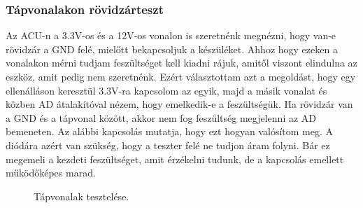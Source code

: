 \documentclass[a4paper, 12pt]{article}
\begin{document}
\subsubsection{Tápvonalakon rövidzárteszt}
Az ACU-n a 3.3V-os és a 12V-os vonalon is szeretnénk megnézni, hogy van-e rövidzár a GND felé, mielőtt bekapcsoljuk a készüléket. Ahhoz hogy ezeken a vonalakon mérni tudjam feszültséget kell kiadni rájuk, amitől viszont elindulna az eszköz, amit pedig nem szeretnénk. Ezért választottam azt a megoldást, hogy egy ellenálláson keresztül 3.3V-ra kapcsolom az egyik, majd a másik vonalat és közben AD átalakítóval nézem, hogy emelkedik-e a feszültségük. Ha rövidzár van a GND és a tápvonal között, akkor nem fog feszültség megjelenni az AD bemeneten. Az alábbi kapcsolás mutatja, hogy ezt hogyan valósítom meg. A diódára azért van szükség, hogy a teszter felé ne tudjon áram folyni. Bár ez megemeli a kezdeti feszültséget, amit érzékelni tudunk, de a kapcsolás emellett működőképes marad.

\begin{figure}[H]
    \centering
    \caption{Tápvonalak tesztelése.}
\end{figure}
\end{document}
